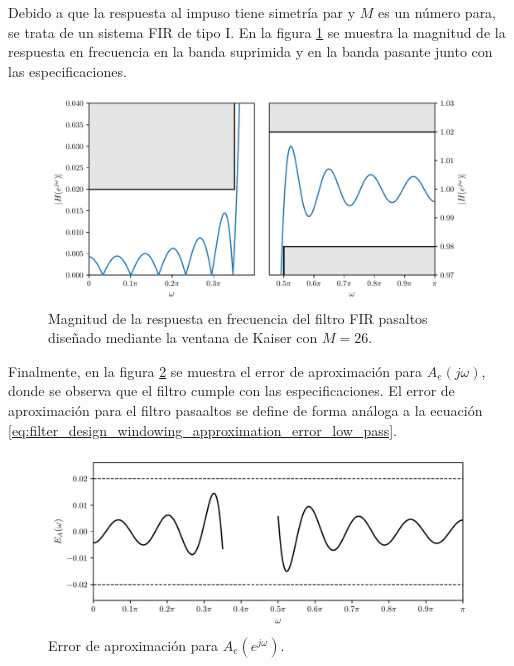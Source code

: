 \documentclass[a4paper]{report}
\begin{document}
Debido a que la respuesta al impuso tiene simetría par y \(M\) es un número para, se trata de un sistema FIR de tipo I. En la figura \ref{fig:filter_design_windowing_kaiser_high_pass_zoom} se muestra la magnitud de la respuesta en frecuencia en la banda suprimida y en la banda pasante junto con las especificaciones.
\begin{figure}[!htb]
 \begin{center}
 \includegraphics[width=1\textwidth]{figuras/filter_design_windowing_kaiser_high_pass_zoom.pdf}
 \caption{\label{fig:filter_design_windowing_kaiser_high_pass_zoom} Magnitud de la respuesta en frecuencia del filtro FIR pasaltos diseñado mediante la ventana de Kaiser con \(M=26\).}
 \end{center}
\end{figure}
Finalmente, en la figura \ref{fig:filter_design_windowing_kaiser_high_pass_aprox_error} se muestra el error de aproximación para \(A_e(j\omega)\), donde se observa que el filtro cumple con las especificaciones. El error de aproximación para el filtro pasaaltos se define de forma análoga a la ecuación \ref{eq:filter_design_windowing_approximation_error_low_pass}.
\begin{figure}[!htb]
 \begin{center}
 \includegraphics[width=1\textwidth]{figuras/filter_design_windowing_kaiser_high_pass_aprox_error.pdf}
 \caption{\label{fig:filter_design_windowing_kaiser_high_pass_aprox_error} Error de aproximación para \(A_e(e^{j\omega})\).}
 \end{center}
\end{figure}
\end{document}
